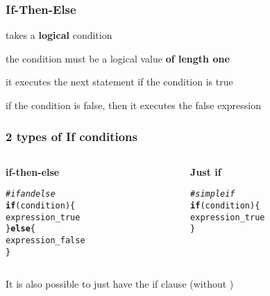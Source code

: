\documentclass[12pt]{beamer}\usepackage[]{graphicx}\usepackage[]{color}
\makeatletter
\newcommand{\hlcom}[1]{\textcolor[rgb]{0.678,0.584,0.686}{\textit{#1}}}%
\newcommand{\hlstd}[1]{\textcolor[rgb]{0.345,0.345,0.345}{#1}}%
\newcommand{\hlkwa}[1]{\textcolor[rgb]{0.161,0.373,0.58}{\textbf{#1}}}%
\newenvironment{kframe}{%
 \def\at@end@of@kframe{}%
 \ifinner\ifhmode%
  \def\at@end@of@kframe{\end{minipage}}%
  \begin{minipage}{\columnwidth}%
 \fi\fi%
 \def\FrameCommand##1{\hskip\@totalleftmargin \hskip-\fboxsep
 \colorbox{shadecolor}{##1}\hskip-\fboxsep
     \hskip-\linewidth \hskip-\@totalleftmargin \hskip\columnwidth}%
 \MakeFramed {\advance\hsize-\width
   \@totalleftmargin\z@ \linewidth\hsize
   \@setminipage}}%
 {\par\unskip\endMakeFramed%
 \at@end@of@kframe}
\newenvironment{knitrout}{}{} %
\makeatother
\begin{document}

\begin{frame}
\frametitle{If-Then-Else}

\bi
  \item {\hilit {}} takes a \textbf{logical} condition
  \item the condition must be a logical value \textbf{of length one}
  \item it executes the next statement if the condition is true
  \item if the condition is false, then it executes the false expression
\ei

\end{frame}


\begin{frame}[fragile]
\frametitle{2 types of If conditions}

\begin{columns}[t]
\begin{column}{0.45\textwidth}
\textbf{if-then-else}
\begin{knitrout}\footnotesize
{}\color{fgcolor}\begin{kframe}
\begin{alltt}
\hlcom{# if and else}
\hlkwa{if} \hlstd{(condition) \{}
  \hlstd{expression_true}
\hlstd{\}} \hlkwa{else} \hlstd{\{}
  \hlstd{expression_false}
\hlstd{\}}
\end{alltt}
\end{kframe}
\end{knitrout}
\end{column}

\begin{column}{0.45\textwidth}
\textbf{Just if}
\begin{knitrout}\footnotesize
{}\color{fgcolor}\begin{kframe}
\begin{alltt}
\hlcom{# simple if}
\hlkwa{if} \hlstd{(condition) \{}
  \hlstd{expression_true}
\hlstd{\}}
\end{alltt}
\end{kframe}
\end{knitrout}
\end{column}
\end{columns}

\bigskip
It is also possible to just have the if clause (without )

\end{frame}
\end{document}
